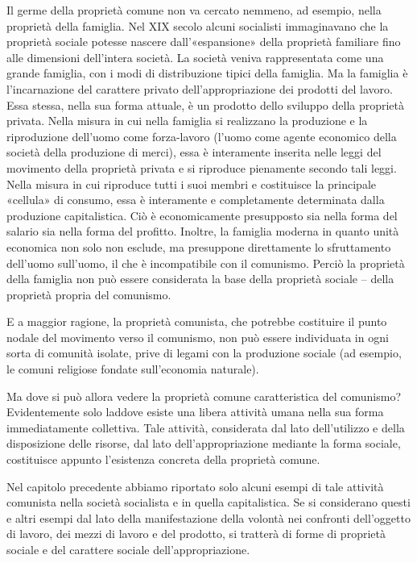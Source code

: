\documentclass[12pt,a4paper,openany]{book}
\begin{document}
Il germe della proprietà comune non va cercato nemmeno, ad esempio, nella proprietà della famiglia. Nel XIX secolo alcuni socialisti immaginavano che la proprietà sociale potesse nascere dall'«espansione» della proprietà familiare fino alle dimensioni dell'intera società. La società veniva rappresentata come una grande famiglia, con i modi di distribuzione tipici della famiglia. Ma la famiglia è l'incarnazione del carattere privato dell'appropriazione dei prodotti del lavoro. Essa stessa, nella sua forma attuale, è un prodotto dello sviluppo della proprietà privata. Nella misura in cui nella famiglia si realizzano la produzione e la riproduzione dell'uomo come forza-lavoro (l'uomo come agente economico della società della produzione di merci), essa è interamente inserita nelle leggi del movimento della proprietà privata e si riproduce pienamente secondo tali leggi. Nella misura in cui riproduce tutti i suoi membri e costituisce la principale «cellula» di consumo, essa è interamente e completamente determinata dalla produzione capitalistica. Ciò è economicamente presupposto sia nella forma del salario sia nella forma del profitto. Inoltre, la famiglia moderna in quanto unità economica non solo non esclude, ma presuppone direttamente lo sfruttamento dell'uomo sull'uomo, il che è incompatibile con il comunismo. Perciò la proprietà della famiglia non può essere considerata la base della proprietà sociale – della proprietà propria del comunismo.

E a maggior ragione, la proprietà comunista, che potrebbe costituire il punto nodale del movimento verso il comunismo, non può essere individuata in ogni sorta di comunità isolate, prive di legami con la produzione sociale (ad esempio, le comuni religiose fondate sull'economia naturale).

Ma dove si può allora vedere la proprietà comune caratteristica del comunismo? Evidentemente solo laddove esiste una libera attività umana nella sua forma immediatamente collettiva. Tale attività, considerata dal lato dell'utilizzo e della disposizione delle risorse, dal lato dell'appropriazione mediante la forma sociale, costituisce appunto l'esistenza concreta della proprietà comune.

Nel capitolo precedente abbiamo riportato solo alcuni esempi di tale attività comunista nella società socialista e in quella capitalistica. Se si considerano questi e altri esempi dal lato della manifestazione della volontà nei confronti dell'oggetto di lavoro, dei mezzi di lavoro e del prodotto, si tratterà di forme di proprietà sociale e del carattere sociale dell'appropriazione.
\end{document}
